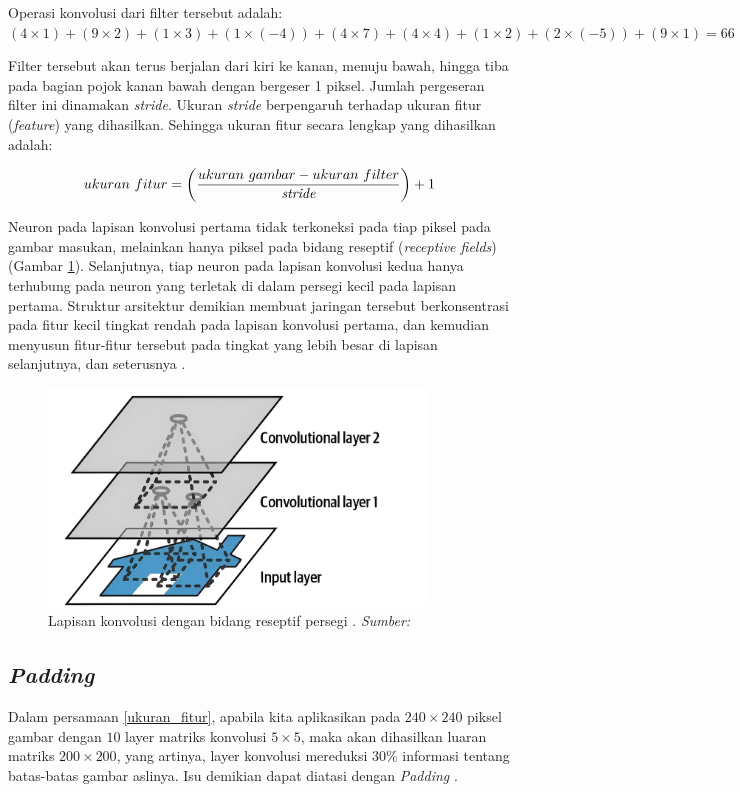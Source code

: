 Operasi konvolusi dari filter tersebut adalah: $(4 \times 1) + (9 \times 2) + (1 \times 3) + (1 \times (-4)) + (4 \times 7) + (4 \times 4) + (1 \times 2) + (2 \times (-5)) + (9 \times 1) = 66 $

Filter tersebut akan terus berjalan dari kiri ke kanan, menuju bawah, hingga tiba pada bagian pojok kanan bawah dengan bergeser 1 piksel. Jumlah pergeseran filter ini dinamakan \emph{stride}. Ukuran \emph{stride} berpengaruh terhadap ukuran fitur (\emph{feature}) yang dihasilkan. Sehingga ukuran fitur secara lengkap yang dihasilkan adalah:

\begin{equation}\label{ukuran_fitur}
    ukuran\ fitur = \left(\frac{ukuran\ gambar - ukuran\ filter}{\emph{stride}}\right) + 1
\end{equation}

Neuron pada lapisan konvolusi pertama tidak terkoneksi pada tiap piksel pada gambar masukan, melainkan hanya piksel pada bidang reseptif (\emph{receptive fields}) (Gambar \ref{receptive_fields}). Selanjutnya, tiap neuron pada lapisan konvolusi kedua hanya terhubung pada neuron yang terletak di dalam persegi kecil pada lapisan pertama. Struktur arsitektur demikian membuat jaringan tersebut berkonsentrasi pada fitur kecil tingkat rendah pada lapisan konvolusi pertama, dan kemudian menyusun fitur-fitur tersebut pada tingkat yang lebih besar di lapisan selanjutnya, dan seterusnya \citep{aurélien_géron_2022}.

\begin{figure}[h]
    \centering
    \includegraphics[width=10cm]{gambar/snapedit_1694621260840.png}
    \caption{Lapisan konvolusi dengan bidang reseptif persegi . \emph{Sumber: \citep{aurélien_géron_2022}}}
    \label{receptive_fields}
\end{figure}

\subsection{\emph{Padding}}
Dalam persamaan \eqref{ukuran_fitur}, apabila kita aplikasikan pada $240 \times 240$ piksel gambar dengan $10$ layer matriks konvolusi $5 \times 5$, maka akan dihasilkan luaran matriks $200 \times 200$, yang artinya, layer konvolusi mereduksi $30\%$ informasi tentang batas-batas gambar aslinya. Isu demikian dapat diatasi dengan \emph{Padding} \citep{zhang2020dive}.

